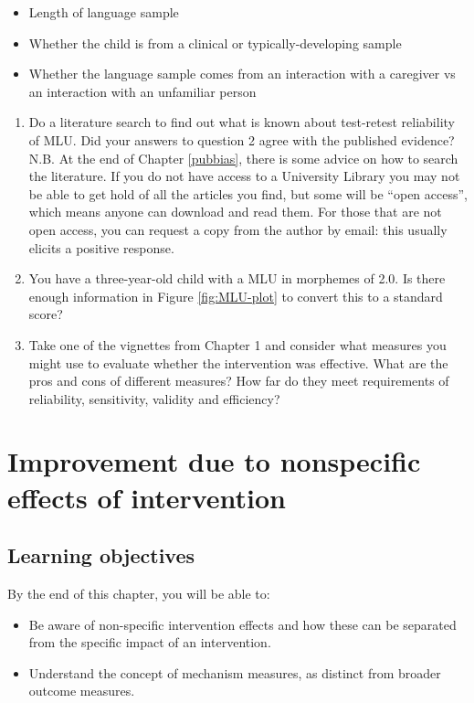 \documentclass{krantz}
\providecommand{\tightlist}{%
\setlength{\itemsep}{0pt}\setlength{\parskip}{0pt}}
\begin{document}
\begin{itemize}
\tightlist
\item
  Length of language sample
\item
  Whether the child is from a clinical or typically-developing sample
\item
  Whether the language sample comes from an interaction with a caregiver vs an interaction with an unfamiliar person
\end{itemize}

\begin{enumerate}
\def\labelenumi{\arabic{enumi}.}
\setcounter{enumi}{2}
\item
  Do a literature search to find out what is known about test-retest reliability of MLU. Did your answers to question 2 agree with the published evidence? N.B. At the end of Chapter \ref{pubbias}, there is some advice on how to search the literature. If you do not have access to a University Library you may not be able to get hold of all the articles you find, but some will be ``open access'', which means anyone can download and read them. For those that are not open access, you can request a copy from the author by email: this usually elicits a positive response.
\item
  You have a three-year-old child with a MLU in morphemes of 2.0. Is there enough information in Figure \ref{fig:MLU-plot} to convert this to a standard score?
\item
  Take one of the vignettes from Chapter 1 and consider what measures you might use to evaluate whether the intervention was effective. What are the pros and cons of different measures? How far do they meet requirements of reliability, sensitivity, validity and efficiency?
\end{enumerate}

\hypertarget{nonspecific}{%
\chapter{Improvement due to nonspecific effects of intervention}\label{nonspecific}}

\hypertarget{learning-objectives-3}{%
\section{Learning objectives}\label{learning-objectives-3}}

By the end of this chapter, you will be able to:

\begin{itemize}
\item
  Be aware of non-specific intervention effects and how these can be separated from the specific impact of an intervention.
\item
  Understand the concept of mechanism measures, as distinct from broader outcome measures.
\end{itemize}
\end{document}
